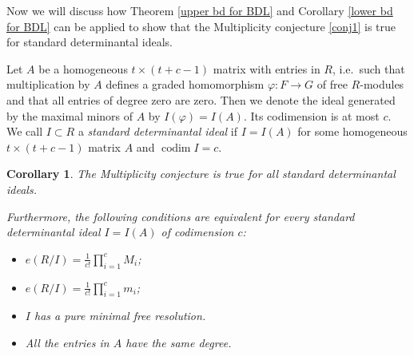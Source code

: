 \documentclass[12pt,twoside]{amsart}
\numberwithin{equation}{section}
\DeclareMathOperator{\codim}{codim}
\newcommand{\ffi}{\varphi}
\newtheorem{corollary}[theorem]{Corollary}
\theoremstyle{definition}
\begin{document}
Now we will discuss how Theorem \ref{upper bd for BDL} and Corollary  \ref{lower bd for
BDL} can be applied to show that the Multiplicity conjecture \ref{conj1} is true for
standard determinantal ideals.

Let $A$ be a homogeneous $t \times (t+c-1)$  matrix with entries in $R$, i.e.\ such that
multiplication by $A$ defines a graded homomorphism $\ffi: F \to G$ of free $R$-modules
and that all entries of degree zero are zero. Then we denote the ideal generated by the
maximal minors of $A$ by $I(\ffi) = I(A)$. Its codimension is at most $c$. We call $I
\subset R$ a {\em standard determinantal ideal} if $I = I(A)$ for some homogeneous $t
\times (t+c-1)$ matrix $A$ and $\codim I = c$.


\begin{corollary} \label{thm-det}
The Multiplicity conjecture  is true for all standard determinantal ideals.

Furthermore, the following conditions are equivalent for every standard determinantal
ideal $I = I(A)$ of codimension $c$:
\begin{itemize}
\item[(i)] $e(R/I) = \frac{1}{c!} \prod_{i=1}^c M_i$;
\item[(ii)] $e(R/I) = \frac{1}{c!} \prod_{i=1}^c m_i$;
\item[(iii)] $I$ has a pure minimal free resolution.
\item[(iv)] All the entries in $A$ have the same degree.
\end{itemize}
\end{corollary}
\end{document}
